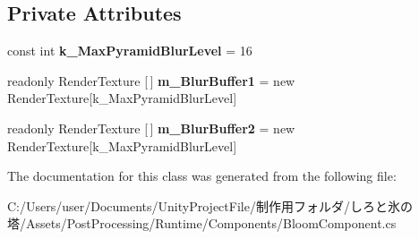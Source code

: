 \subsection*{Private Attributes}
\begin{DoxyCompactItemize}
\item 
\mbox{\label{class_unity_engine_1_1_post_processing_1_1_bloom_component_ad6c3cb32c5ea3ecf793012eddd81959c}} 
const int {\bfseries k\+\_\+\+Max\+Pyramid\+Blur\+Level} = 16
\item 
\mbox{\label{class_unity_engine_1_1_post_processing_1_1_bloom_component_aef85ac8a496197af07a3d37f1a43b6f6}} 
readonly Render\+Texture \mbox{[}$\,$\mbox{]} {\bfseries m\+\_\+\+Blur\+Buffer1} = new Render\+Texture\mbox{[}k\+\_\+\+Max\+Pyramid\+Blur\+Level\mbox{]}
\item 
\mbox{\label{class_unity_engine_1_1_post_processing_1_1_bloom_component_a32bd65ea5680fa0905dd18cacd1a4bf8}} 
readonly Render\+Texture \mbox{[}$\,$\mbox{]} {\bfseries m\+\_\+\+Blur\+Buffer2} = new Render\+Texture\mbox{[}k\+\_\+\+Max\+Pyramid\+Blur\+Level\mbox{]}
\end{DoxyCompactItemize}


The documentation for this class was generated from the following file\+:\begin{DoxyCompactItemize}
\item 
C\+:/\+Users/user/\+Documents/\+Unity\+Project\+File/制作用フォルダ/しろと氷の塔/\+Assets/\+Post\+Processing/\+Runtime/\+Components/Bloom\+Component.\+cs\end{DoxyCompactItemize}
